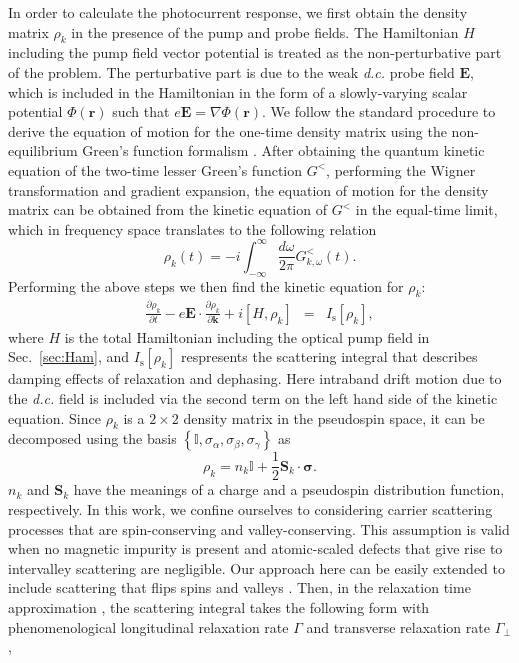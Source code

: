 \documentclass[reprint,amsmath,amssymb,aps,prb]{revtex4-1}
\begin{document}
In order to calculate the photocurrent response, we first obtain the density matrix $\rho_k$  in the presence of the pump and probe fields. The Hamiltonian $H$ including the pump field vector potential is treated as the non-perturbative part of the problem. The perturbative part is due to the weak \textit{d.c.} probe field $\bm{E}$, which is  included in the Hamiltonian in the form of a slowly-varying scalar potential $\Phi(\bm{r})$ such that  $e\bm{E} = \nabla\Phi(\bm{r})$. We follow the standard procedure to derive the equation of motion for the one-time density matrix using the non-equilibrium Green's function formalism \cite{Jauho_book,Rammer}. After obtaining the quantum kinetic equation of the two-time lesser Green's function $G^<$, performing the Wigner transformation and gradient expansion, the equation of motion for the density matrix can be obtained from the kinetic equation of $G^<$ in the equal-time limit, which in frequency space translates to the following relation 
%
\begin{equation}
\rho_{{k}}(t) = -i\int_{-\infty}^{\infty}\frac{d\omega}{2\pi} G_{{k,\omega}}^<(t). \label{DMG} 
\end{equation}
%
Performing the above steps we then find the kinetic equation for $\rho_k$:
\begin{eqnarray}
\frac{\partial \rho_k}{\partial t}-e\bm{E}\cdot\frac{\partial \rho_k}{\partial \bm{k}}+i\left[H,\rho_k\right] &=& I_{\mathrm{s}}[\rho_k], \label{QKEE}
\end{eqnarray}
%
where $H$ is the total Hamiltonian including the optical pump field in Sec.~\ref{sec:Ham}, and $ I_{\mathrm{s}}[\rho_k]$ respresents the scattering integral that describes damping effects of relaxation and dephasing. Here intraband drift motion due to the \textit{d.c.} field is included via the second term on the left hand side of the kinetic equation. Since $\rho_{{k}}$ is a $2\times 2$ density matrix in the pseudospin space, it can be decomposed using the basis 
$\left\{\mathbb{I},\sigma_\alpha,\sigma_\beta,\sigma_\gamma\right\}$ as 
%
\begin{equation}
\rho_k=n_k\mathbb{I}+\frac{1}{2}\bm{S}_k\cdot\bm{\sigma}. \label{rhoDM}
\end{equation}
%
$n_k$ and $\bm{S}_k$ have the meanings of a charge and a pseudospin distribution function, respectively. In this work, we confine ourselves to considering carrier scattering processes that are spin-conserving and valley-conserving. This assumption is valid when no magnetic impurity is present and atomic-scaled defects that give rise to intervalley scattering are negligible. Our approach here can be easily extended to include scattering that flips spins and valleys \cite{spin_noise}. Then, in the relaxation time approximation \cite{haug2009quantum}, the scattering integral takes the following form with phenomenological  longitudinal relaxation rate $\Gamma$ and transverse relaxation rate $\Gamma_\perp$,
\end{document}
